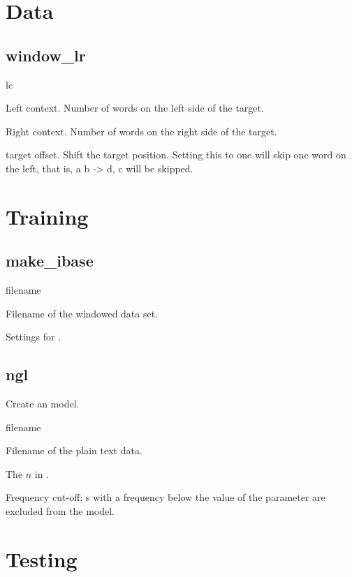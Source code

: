 \documentclass[a4paper,10pt,twoside]{report}
\begin{document}
\section{Data}

\subsection{window\_lr}

\begin{varlist}{lc}
\item[lc] Left context. Number of words on the left side of the target.
\item[rc] Right context. Number of words on the right side of the target.
\item[to] target offset. Shift the target position. Setting this to
  one will skip one word on the left, that is, a b -> d, c will be skipped.
\end{varlist}

\section{Training}

\subsection{make\_ibase}

\begin{varlist}{filename}
\item[filename] Filename of the windowed data set.
\item[timbl] Settings for \Timbl{}.
\end{varlist}

\subsection{ngl}

Create an \ngram{} model.

\begin{varlist}{filename}
\item[filename] Filename of the plain text data.
\item[n] The $n$ in \ngram{}.
\item[fco] Frequency cut-off; \ngram{}s with a frequency below the
  value of the  parameter are excluded from the model.
\end{varlist}


\section{Testing}
\end{document}
